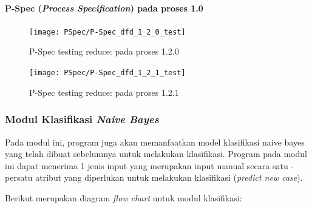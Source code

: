 \paragraph{P-Spec (\textit{Process Specification}) pada proses 1.0}

\begin{figure}[H]
	\centering
	\texttt{[image: PSpec/P-Spec\_dfd\_1\_2\_0\_test]}
	\caption[P-Spec testing reduce: pada proses 1.2.0]{P-Spec testing reduce: pada proses 1.2.0}
	\label{fig:P-Spec testing reduce: pada proses 1.2.0}
\end{figure}

\begin{figure}[H]
	\centering
	\texttt{[image: PSpec/P-Spec\_dfd\_1\_2\_1\_test]}
	\caption[P-Spec testing reduce: pada proses 1.2.1]{P-Spec testing reduce: pada proses 1.2.1}
	\label{fig:P-Spec testing reduce: pada proses 1.2.1}
\end{figure}


\subsubsection{Modul Klasifikasi \textit{Naive Bayes}}

Pada modul ini, program juga akan memanfaatkan model klasifikasi naive bayes yang telah dibuat sebelumnya untuk melakukan klasifikasi. Program pada modul ini dapat menerima 1 jenis input yang merupakan input manual secara satu - persatu atribut yang diperlukan untuk melakukan klasifikasi (\textit{predict new case}).

Berikut merupakan diagram \textit{flow chart} untuk modul klasifikasi:

